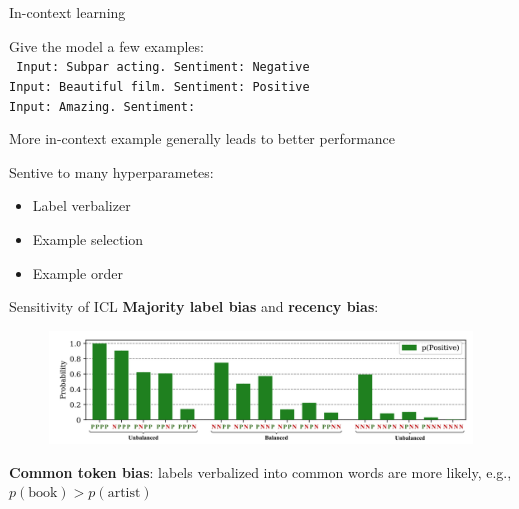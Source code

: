 \documentclass[usenames,dvipsnames,notes,11pt,aspectratio=169,hyperref={colorlinks=true, linkcolor=blue}]{beamer}
\newcommand{\pdfnote}[1]{}
\begin{document}
\begin{frame}
    {In-context learning}

    Give the model a few examples:\\[1em]
    {\tt
    Input: Subpar acting. Sentiment: Negative\\
    Input: Beautiful film. Sentiment: Positive\\
    Input: Amazing. Sentiment:
    }

    \pdfnote{\url{https://lilianweng.github.io/posts/2023-03-15-prompt-engineering/\#few-shot}}

    More in-context example generally leads to better performance
    \pdfnote{Demo performance with varying number of examples}

    \pause
    Sentive to many hyperparametes:
    \begin{itemize}
        \item Label verbalizer
        \item Example selection
        \item Example order
    \end{itemize}
\end{frame}

\begin{frame}
    {Sensitivity of ICL}{\mycite{[Zhao et al., 2021]}}
    {\bf Majority label bias} and {\bf recency bias}:\\
    \begin{figure}
        \includegraphics[width=\textwidth]{figures/icl-cal}
    \end{figure}

    {\bf Common token bias}: labels verbalized into common words are more likely, e.g., $p(\text{book}) > p(\text{artist})$ 
\end{frame}
\end{document}
